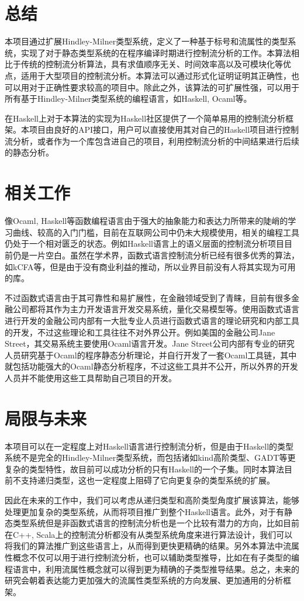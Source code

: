 \documentclass[UTF8, colorlinks]{pkuthss}
\begin{document}
	\section{总结}
	本项目通过扩展Hindley-Milner类型系统，定义了一种基于标号和流属性的类型系统，实现了对于静态类型系统的在程序编译时期进行控制流分析的工作。本算法相比于传统的控制流分析算法，具有求值顺序无关、时间效率高以及可模块化等优点，适用于大型项目的控制流分析。本算法可以通过形式化证明证明其正确性，也可以用对于正确性要求较高的项目中。除此之外，该算法的可扩展性强，可以用于所有基于Hindley-Milner类型系统的编程语言，如Haskell, Ocaml等。
	
	在Haskell上对于本算法的实现为Haskell社区提供了一个简单易用的控制流分析框架。本项目由良好的API接口，用户可以直接使用其对自己的Haskell项目进行控制流分析，或者作为一个库包含进自己的项目，利用控制流分析的中间结果进行后续的静态分析。
	\section{相关工作}
	像Ocaml, Haskell等函数编程语言由于强大的抽象能力和表达力所带来的陡峭的学习曲线、较高的入门门槛，目前在互联网公司中仍未大规模使用，相关的编程工具仍处于一个相对匮乏的状态。例如Haskell语言上的语义层面的控制流分析项目目前仍是一片空白。虽然在学术界，函数式语言控制流分析已经有很多优秀的算法，如kCFA等，但是由于没有商业利益的推动，所以业界目前没有人将其实现为可用的库。
	
	不过函数式语言由于其可靠性和易扩展性，在金融领域受到了青睐，目前有很多金融公司都将其作为主力开发语言开发交易系统，量化交易模型等。使用函数式语言进行开发的金融公司内部有一大批专业人员进行函数式语言的理论研究和内部工具的开发，不过这些理论和工具往往不对外界公开。例如美国的金融公司Jane Street，其交易系统主要使用Ocaml语言开发。Jane Street公司内部有专业的研究人员研究基于Ocaml的程序静态分析理论，并自行开发了一套Ocaml工具链，其中就包括功能强大的Ocaml静态分析程序，不过这些工具并不公开，所以外界的开发人员并不能使用这些工具帮助自己项目的开发。
	\section{局限与未来}
	本项目可以在一定程度上对Haskell语言进行控制流分析，但是由于Haskell的类型系统不是完全的Hindley-Milner类型系统，而包括诸如kind高阶类型、GADT等更复杂的类型特性，故目前可以成功分析的只有Haskell的一个子集。同时本算法目前不支持递归类型，这也一定程度上阻碍了它向更复杂的类型系统的扩展。
	
	因此在未来的工作中，我们可以考虑从递归类型和高阶类型角度扩展该算法，能够处理更加复杂的类型系统，从而将项目推广到整个Haskell语言。此外，对于有静态类型系统但是非函数式语言的控制流分析也是一个比较有潜力的方向，比如目前在C++, Scala上的控制流分析都没有从类型系统角度来进行算法设计，我们可以将我们的算法推广到这些语言上，从而得到更快更精确的结果。另外本算法中流属性概念不仅可以用于进行控制流分析，也可以辅助类型推导，比如在有子类型的编程语言中，利用流属性概念就可以得到更为精确的子类型推导结果。总之，未来的研究会朝着表达能力更加强大的流属性类型系统的方向发展、更加通用的分析框架。
	
\end{document}
